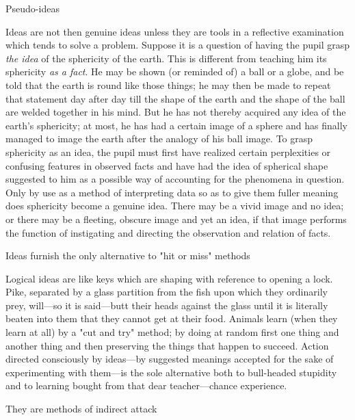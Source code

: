 \documentclass[letterpaper]{book}
\begin{document}
Pseudo-ideas

Ideas are not then genuine ideas unless they are tools in a reflective
examination which tends to solve a problem. Suppose it is a question of
having the pupil grasp \emph{the idea} of the sphericity of the earth.
This is different from teaching him its sphericity \emph{as a fact}. He
may be shown (or reminded of) a ball or a globe, and be told that the
earth is round like those things; he may then be made to repeat that
statement day after day till the shape of the earth and the shape of the
ball are welded together in his mind. But he has not thereby acquired
any idea of the earth's sphericity; at most, he has had a certain image
of a sphere and has finally managed to image the earth after the analogy
of his ball image. To grasp sphericity as an idea, the pupil must first
have realized certain perplexities or confusing features in observed
facts and have had the idea of spherical shape suggested to him as a
possible way of accounting for the phenomena in question. Only by use as
a method of interpreting data so as to give them fuller meaning does
sphericity become a genuine idea. There may be a vivid image and no
idea; or there may be a fleeting, obscure image and yet an idea, if that
image performs the function of instigating and directing the observation
and relation of facts.

Ideas furnish the only alternative to "hit or miss" methods

Logical ideas are like keys which are shaping with reference to opening
a lock. Pike, separated by a glass partition from the fish upon which
they ordinarily prey, will---so it is said---butt their heads against
the glass until it is literally beaten into them that they cannot get at
their food. Animals learn (when they learn at all) by a "cut and try"
method; by doing at
random
first one thing and another thing and then preserving the things that
happen to succeed. Action directed consciously by ideas---by suggested
meanings accepted for the sake of experimenting with them---is the sole
alternative both to bull-headed stupidity and to learning bought from
that dear teacher---chance experience.

They are methods of indirect attack
\end{document}
